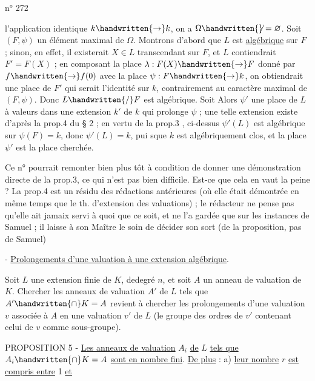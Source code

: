  \hfill n° 272

l'application identique $k\handwritten{\to} k$, on a $\Omega\handwritten{\not}=\varnothing$. Soit $(F,\psi)$ un élément maximal de $\Omega$. Montrons d'abord que $L$ est \uline{algébrique} sur $F$ ; sinon, en effet, il existerait $X\in L$ transcendant sur $F$, et $L$ contiendrait $F'=F(X)$ ; en composant la place $\lambda:F(X)\handwritten{\to} F$ donné par $f\handwritten{\to} f(0)$ avec la place $\psi:F\handwritten{\to} k$, on obtiendrait une place de $F'$ qui serait l'identité sur $k$, contrairement au caractère maximal de $(F,\psi)$. Donc $L\handwritten{/}F$ est algébrique. Soit Alors $\psi'$ une place de $L$ à valeurs dans une extension $k'$ de $k$ qui prolonge $\psi$ ; une telle extension existe d'après la prop.4 du § 2 ; en vertu de la prop.3 , ci-dessus\unsure{,|;} $\psi'(L)$ est algébrique sur $\psi(F)=k$, donc $\psi'(L)=k$, pui sque $k$ est algébriquement clos, et la place $\psi'$ est la place cherchée.

\handwritten{[}Ce n° pourrait remonter bien plus tôt à condition de donner une démonstration directe de la prop.3, ce qui n'est pas bien difficile. Est-ce que cela en vaut la peine ? La prop.4 est un résidu des rédactions antérieures (où elle était démontrée en même temps que le th. d'extension des valuations) ; le rédacteur ne pense pas qu'elle ait jamaix servi à quoi que ce soit, et ne l'a gardée que sur les instances de Samuel ; il laisse à son Maître le soin de décider son sort (de la proposition, pas de Samuel)\handwritten{]}

 - \uline{Prolongements d'une valuation à une extension algébrique}.

Soit $L$ une extension finie de $K$, dedegré $n$, et soit $A$ un anneau de valuation de $K$. Chercher les anneaux de valuation $A'$ de $L$ tels que $A'\handwritten{\cap} K=A$ revient à chercher les prolongements d'une valuation $v$ associée à $A$ en une valuation $v'$ de $L$ (le groupe des ordres de $v'$ contenant celui de $v$ comme sous-groupe).

PROPOSITION 5 - \uline{Les anneaux de valuation} $A_i$ \uline{de} $L$ \uline{tels que} $A_i\handwritten{\cap} K=A$ \uline{sont en nombre fini}. \uline{De plus} : a) \uline{leur nombre} $r$ \uline{est compris entre} 1 \uline{et}

